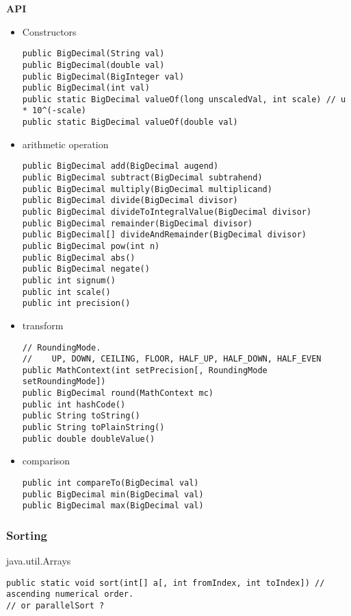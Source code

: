 \textbf{API}
\begin{itemize}
\item Constructors
\begin{lstlisting}
public BigDecimal(String val)
public BigDecimal(double val)
public BigDecimal(BigInteger val)
public BigDecimal(int val)
public static BigDecimal valueOf(long unscaledVal, int scale) // u * 10^(-scale)
public static BigDecimal valueOf(double val)
\end{lstlisting}

\item arithmetic operation
\begin{lstlisting}
public BigDecimal add(BigDecimal augend)
public BigDecimal subtract(BigDecimal subtrahend)
public BigDecimal multiply(BigDecimal multiplicand)
public BigDecimal divide(BigDecimal divisor)
public BigDecimal divideToIntegralValue(BigDecimal divisor)
public BigDecimal remainder(BigDecimal divisor)
public BigDecimal[] divideAndRemainder(BigDecimal divisor)
public BigDecimal pow(int n)
public BigDecimal abs()
public BigDecimal negate()
public int signum()
public int scale()
public int precision()
\end{lstlisting}

\item transform
\begin{lstlisting}
// RoundingMode.
//    UP, DOWN, CEILING, FLOOR, HALF_UP, HALF_DOWN, HALF_EVEN
public MathContext(int setPrecision[, RoundingMode setRoundingMode])
public BigDecimal round(MathContext mc)
public int hashCode()
public String toString()
public String toPlainString()
public double doubleValue()
\end{lstlisting}

\item comparison
\begin{lstlisting}
public int compareTo(BigDecimal val)
public BigDecimal min(BigDecimal val)
public BigDecimal max(BigDecimal val)
\end{lstlisting}
\end{itemize}

\subsubsection{Sorting}
java.util.Arrays
\begin{lstlisting}
public static void sort(int[] a[, int fromIndex, int toIndex]) // ascending numerical order.
// or parallelSort ?
\end{lstlisting}
